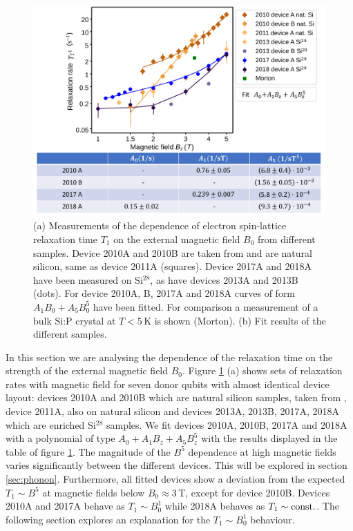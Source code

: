 \begin{figure}
\centering
\includegraphics[width=\columnwidth]{figures/fig3.pdf}
\caption{(a) Measurements of the dependence of electron spin-lattice relaxation time $T_1$ on the external magnetic field $B_0$ from different samples. Device 2010A and 2010B are taken from \cite{Morello2010} and are natural silicon, same as device 2011A (squares). Device 2017A and 2018A have been measured on Si$^{28}$, as have devices 2013A and 2013B (dots). For device 2010A, B, 2017A and 2018A curves of form $A_1B_0+A_5B_0^5$ have been fitted. For comparison a measurement of a bulk Si:P crystal at $T<5\,$K is shown (Morton). (b) Fit results of the different samples. 
}
\label{fig:magnetic field dependence}
\end{figure}


In this section we are analysing the dependence of the relaxation time on the strength of the external magnetic field $B_0$. Figure \ref{fig:magnetic field dependence} (a) shows sets of relaxation rates with magnetic field for seven donor qubits with almost identical device layout: devices 2010A and 2010B which are  natural silicon samples, taken from \cite{Morello2010},
device 2011A, also on natural silicon and devices 2013A, 2013B, 2017A, 2018A which are enriched Si$^{28}$ samples. We fit devices 2010A, 2010B, 2017A and 2018A with a polynomial of type $A_0+A_1B_z+A_5B_z^5$ with the results displayed in the table of figure \ref{fig:magnetic field dependence}.  The magnitude of the $B^5$ dependence at high magnetic fields varies significantly between the different devices. This will be explored in section \ref{sec:phonon}.
Furthermore, all fitted devices show a deviation from the expected $T_1\sim B^5$ at magnetic fields below $B_0\approx3\,$T, except for device 2010B. Devices 2010A and 2017A behave as $T_1\sim B_0^1$ while 2018A behaves as $T_1\sim \rm{const.}$. The following section explores an explanation for the $T_1\sim B_0^1$ behaviour.

